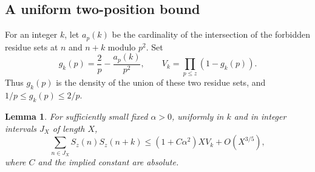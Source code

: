 \documentclass[11pt,reqno]{amsart}
\newtheorem{lemma}[theorem]{Lemma}
\theoremstyle{remark}
\numberwithin{equation}{section}
\begin{document}
\subsection{A uniform two-position bound}\label{subsec:selberg}

For an integer $k$, let $a_p(k)$ be the cardinality of the intersection
of the forbidden residue sets at $n$ and $n+k$ modulo $p^2$.
Set
\[
 g_k(p)=\frac2p-\frac{a_p(k)}{p^2},\qquad
 V_k=\prod_{p\leq z}(1-g_k(p)).
\]
Thus $g_k(p)$ is the density of the union of these two residue sets,
and $1/p\leq g_k(p)\leq2/p$.

\begin{lemma}\label{lem:twoposition}
For sufficiently small fixed $\alpha>0$, uniformly in $k$ and in
integer intervals $J_X$ of length $X$,
\begin{equation}\label{eq:twoposition}
 \sum_{n\in J_X}S_z(n)S_z(n+k)
 \leq(1+C\alpha^2)XV_k+O(X^{3/5}),
\end{equation}
where $C$ and the implied constant are absolute.
\end{lemma}
\end{document}
